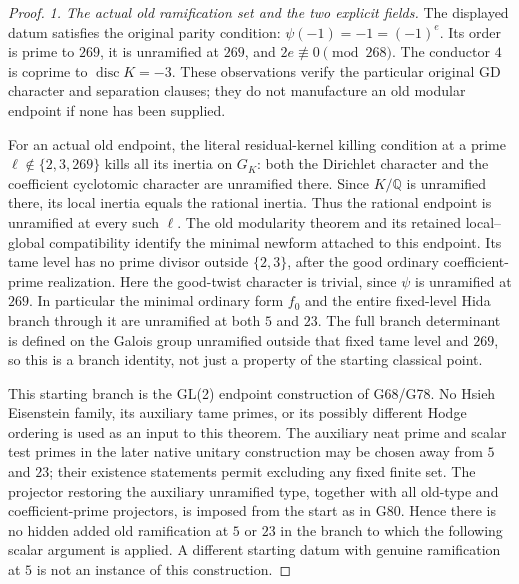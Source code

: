 \begin{proof}
\emph{1. The actual old ramification set and the two explicit fields.}
The displayed datum satisfies the original parity condition:
$\psi(-1)=-1=(-1)^e$.  Its order is prime to $269$,
it is unramified at $269$, and $2e\not\equiv0\pmod{268}$.
The conductor $4$ is coprime to $\operatorname{disc}K=-3$.
These observations verify the particular original $\mathrm{GD}$
character and separation clauses; they do not manufacture an old
modular endpoint if none has been supplied.

For an actual old endpoint, the literal residual-kernel killing
condition at a prime $\ell\notin\{2,3,269\}$ kills all its inertia
on $G_K$: both the Dirichlet character and the coefficient cyclotomic
character are unramified there.  Since $K/\mathbb Q$ is unramified
there, its local inertia equals the rational inertia.  Thus the
rational endpoint is unramified at every such $\ell$.
The old modularity theorem and its retained local--global compatibility
identify the minimal newform attached to this endpoint.  Its tame
level has no prime divisor outside $\{2,3\}$, after the good ordinary
coefficient-prime realization.  Here the good-twist character is
trivial, since $\psi$ is unramified at $269$.
In particular the minimal ordinary form $f_0$ and the entire
fixed-level Hida branch through it are unramified at both $5$ and $23$.
The full branch determinant is defined on the Galois group unramified
outside that fixed tame level and $269$, so this is a branch identity,
not just a property of the starting classical point.

This starting branch is the GL(2) endpoint construction of G68/G78.
No Hsieh Eisenstein family, its auxiliary tame primes, or its possibly
different Hodge ordering is used as an input to this theorem.
The auxiliary neat prime and scalar test primes in the later native
unitary construction may be chosen away from $5$ and $23$; their
existence statements permit excluding any fixed finite set.
The projector restoring the auxiliary unramified type, together with
all old-type and coefficient-prime projectors, is imposed from the
start as in G80.  Hence there is no hidden added old ramification at
$5$ or $23$ in the branch to which the following scalar argument is
applied.  A different starting datum with genuine ramification at
$5$ is not an instance of this construction.


\end{proof}
